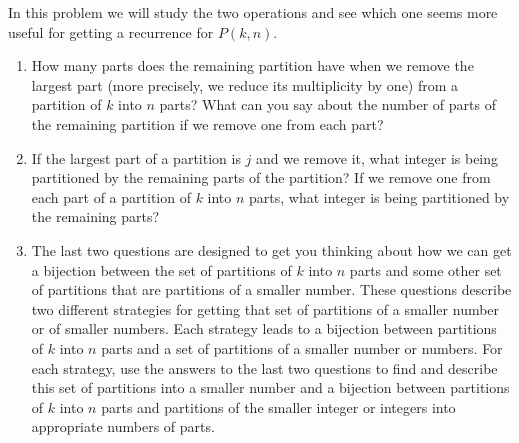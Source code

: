 {\bp \itemesi In this problem we will study the two operations and see
which one seems more useful for getting a recurrence for
$P(k,n)$.\label{numberpartitionrecurrence}
\begin{enumerate}

\item How many parts does the remaining partition
have when we remove the largest part (more precisely, we reduce its
multiplicity by one) from a partition of
$k$ into
$n$ parts?  What can you say about the number of parts of the remaining
partition if we remove one from each part?

\item If the largest part of a partition is $j$ and we remove it,
what integer is being partitioned by the remaining parts of the
partition? If we remove one from each part of a partition of $k$ into
$n$ parts, what integer is being partitioned by the remaining parts? 

\item The last two questions are designed to get you thinking about how
we can get a bijection between the set of  partitions of $k$ into
$n$ parts and some other set of partitions that are partitions of a
smaller number.  These questions describe two different strategies for
getting that set of partitions of a smaller number or of smaller numbers. 
Each strategy leads to a bijection between partitions of $k$ into $n$
parts and a set of partitions of a smaller number or numbers.  For each
strategy, use the answers to the last two questions to find and describe 
this set of partitions into a smaller number and a bijection between
partitions of
$k$ into
$n$ parts and partitions of the smaller integer or integers into
appropriate numbers of parts.
\end{enumerate}}
